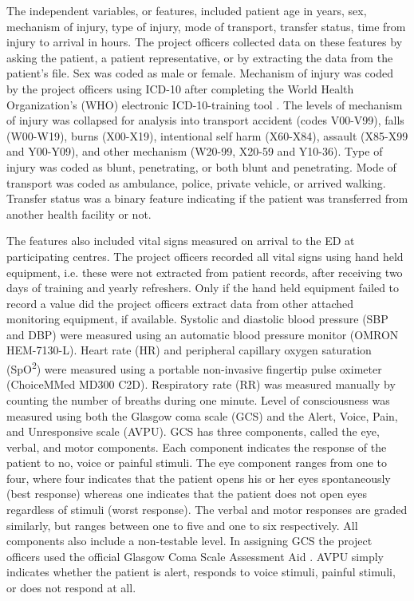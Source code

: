\documentclass[10pt,letterpaper]{article}\usepackage[]{graphicx}\usepackage[]{color}
\begin{document}
The independent variables, or features, included patient age in years, sex,
mechanism of injury, type of injury, mode of transport, transfer status, time
from injury to arrival in hours. The project officers collected data on these
features by asking the patient, a patient representative, or by extracting the
data from the patient's file. Sex was coded as male or female. Mechanism of
injury was coded by the project officers using ICD-10 after completing the World
Health Organization's (WHO) electronic ICD-10-training tool \cite{WHOICD}. The
levels of mechanism of injury was collapsed for analysis into transport accident
(codes V00-V99), falls (W00-W19), burns (X00-X19), intentional self harm
(X60-X84), assault (X85-X99 and Y00-Y09), and other mechanism (W20-99, X20-59
and Y10-36). Type of injury was coded as blunt, penetrating, or both blunt and
penetrating. Mode of transport was coded as ambulance, police, private vehicle,
or arrived walking. Transfer status was a binary feature indicating if the
patient was transferred from another health facility or not.

The features also included vital signs measured on arrival to the ED at
participating centres. The project officers recorded all vital signs using hand
held equipment, i.e. these were not extracted from patient records, after
receiving two days of training and yearly refreshers. Only if the hand held
equipment failed to record a value did the project officers extract data from
other attached monitoring equipment, if available. Systolic and diastolic blood
pressure (SBP and DBP) were measured using an automatic blood pressure monitor
(OMRON HEM-7130-L). Heart rate (HR) and peripheral capillary oxygen saturation
(SpO\textsuperscript{2}) were measured using a portable non-invasive fingertip
pulse oximeter (ChoiceMMed MD300 C2D). Respiratory rate (RR) was measured
manually by counting the number of breaths during one minute. Level of
consciousness was measured using both the Glasgow coma scale (GCS) and the
Alert, Voice, Pain, and Unresponsive scale (AVPU). GCS has three components,
called the eye, verbal, and motor components. Each component indicates the
response of the patient to no, voice or painful stimuli. The eye component
ranges from one to four, where four indicates that the patient opens his or her
eyes spontaneously (best response) whereas one indicates that the patient does
not open eyes regardless of stimuli (worst response). The verbal and motor
responses are graded similarly, but ranges between one to five and one to six
respectively. All components also include a non-testable level. In assigning GCS
the project officers used the official Glasgow Coma Scale Assessment Aid
\cite{GCSAID}. AVPU simply indicates whether the patient is alert, responds to
voice stimuli, painful stimuli, or does not respond at all.
\end{document}
